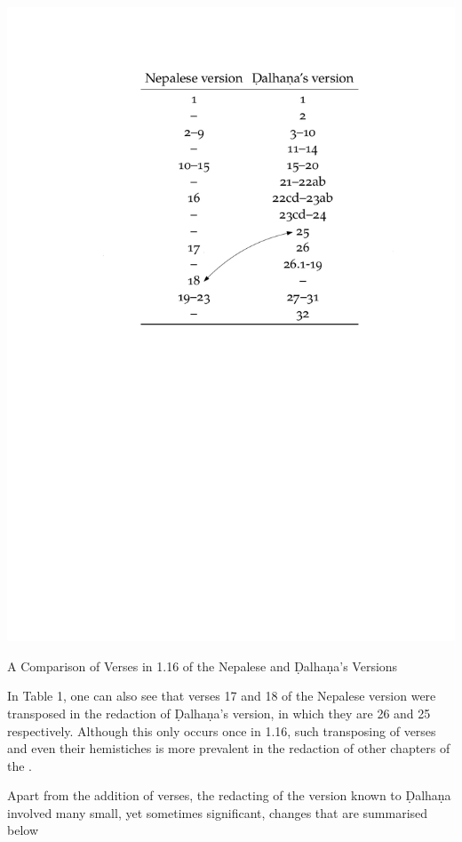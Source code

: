 \begin{table}
\centering
\includegraphics[draft=false,width=\textwidth]{table-of-versions.pdf}
\caption{A Comparison of Verses in 1.16 of the Nepalese and Ḍalhaṇa's Versions}
\end{table}

In Table 1, one can also see that verses 17 and 18 of the Nepalese version were transposed in the redaction of Ḍalhaṇa's version, in which they are 26 and 25 respectively. Although this only occurs once in 1.16, such transposing of verses and even their hemistiches is more prevalent in the redaction of other chapters of the \SS.

Apart from the addition of verses, the redacting of the version known to Ḍalhaṇa involved many small, yet sometimes significant, changes that are summarised below 


